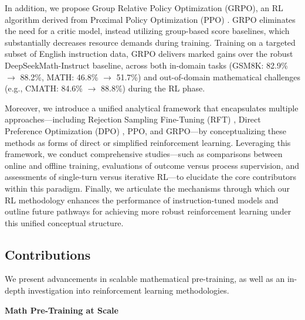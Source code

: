 In addition, we propose Group Relative Policy Optimization (GRPO), an RL algorithm derived from Proximal Policy Optimization (PPO) \citep{schulman2017proximal}. GRPO eliminates the need for a critic model, instead utilizing group-based score baselines, which substantially decreases resource demands during training. Training on a targeted subset of English instruction data, GRPO delivers marked gains over the robust DeepSeekMath-Instruct baseline, across both in-domain tasks (GSM8K: 82.9\% $\rightarrow$ 88.2\%, MATH: 46.8\% $\rightarrow$ 51.7\%) and out-of-domain mathematical challenges (e.g., CMATH: 84.6\% $\rightarrow$ 88.8\%) during the RL phase. 

Moreover, we introduce a unified analytical framework that encapsulates multiple approaches—including Rejection Sampling Fine-Tuning (RFT) \citep{yuan2023scaling}, Direct Preference Optimization (DPO) \citep{dpo}, PPO, and GRPO—by conceptualizing these methods as forms of direct or simplified reinforcement learning. Leveraging this framework, we conduct comprehensive studies—such as comparisons between online and offline training, evaluations of outcome versus process supervision, and assessments of single-turn versus iterative RL—to elucidate the core contributors within this paradigm. Finally, we articulate the mechanisms through which our RL methodology enhances the performance of instruction-tuned models and outline future pathways for achieving more robust reinforcement learning under this unified conceptual structure.

\subsection{Contributions}
We present advancements in scalable mathematical pre-training, as well as an in-depth investigation into reinforcement learning methodologies.

\textbf{Math Pre-Training at Scale}

